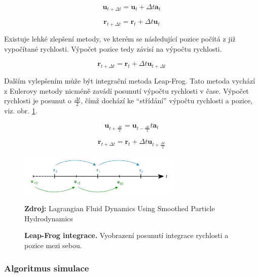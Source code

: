 \begin{equation}
    \mathbf{u}_{t + \Delta t} = \mathbf{u}_t + \Delta t \mathbf{a}_t
\end{equation}

\begin{equation}
    \mathbf{r}_{t + \Delta t} = \mathbf{r}_t + \Delta t \mathbf{u}_t
\end{equation}

Existuje lehké zlepšení metody, ve kterém se následující pozice počítá z již vypočítané rychlosti. Výpočet pozice tedy závisí na výpočtu rychlosti. \cite{KelagerSPH}

\begin{equation}
    \mathbf{r}_{t + \Delta t} = \mathbf{r}_t + \Delta t \mathbf{u}_{t + \Delta t}
\end{equation}

Dalším vylepšením může být integrační metoda Leap-Frog. Tato metoda vychází z Eulerovy metody nicméně zavádí posunutí výpočtu rychlosti v čase. Výpočet rychlosti je posunut o $\frac{\Delta t}{2}$, čímž dochází ke \enquote{střídání} výpočtu rychlosti a pozice, viz. obr. \ref{fig:LeapFrog}.

\begin{equation}
    \mathbf{u}_{t + \frac{\Delta t}{2}} = \mathbf{u}_{t - \frac{\Delta t}{2}} t \mathbf{a}_t
    \label{eq:LeapVel}
\end{equation}

\begin{equation}
    \mathbf{r}_{t + \Delta t} = \mathbf{r}_t + \Delta t \mathbf{u}_{t + \frac{\Delta t}{2}}
    \label{eq:LeapPos}
\end{equation}

\begin{figure}[hbt]
	\centering
	\captionsetup{justification=centering}
	\includegraphics[width=0.7\textwidth]{obrazky-figures/leapFrog.PNG}
	\caption{\textbf{Leap-Frog integrace.} Vyobrazení posunutí integrace rychlosti a pozice mezi sebou.}
	\textbf{Zdroj: } Lagrangian Fluid Dynamics Using Smoothed Particle Hydrodynamics \cite{KelagerSPH}
	\label{fig:LeapFrog}
\end{figure}

\subsubsection{Algoritmus simulace}

